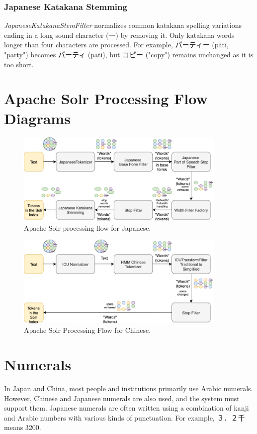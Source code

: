 \documentclass[11pt]{article}
\begin{document}
\subsubsection{Japanese Katakana Stemming}
\textit{JapaneseKatakanaStemFilter} normalizes common katakana spelling variations ending in a long sound character (ー) by removing it. Only katakana words longer than four characters are processed. For example, パーティー (pātī, "party") becomes パーティ (pāti), but コピー ("copy") remains unchanged as it is too short.

\section{Apache Solr Processing Flow Diagrams}

\begin{figure}[h!]
    \centering
    \includegraphics[width=0.9\textwidth]{schem1.png}
    \caption{Apache Solr processing flow for Japanese.}
    \label{fig:solr_japanese_flow}
\end{figure}

\begin{figure}[h!]
    \centering
    \includegraphics[width=0.9\textwidth]{chinese-japanese.png}
    \caption{Apache Solr Processing Flow for Chinese.}
    \label{fig:solr_chinese_flow}
\end{figure}

\section{Numerals}
In Japan and China, most people and institutions primarily use Arabic numerals. However, Chinese and Japanese numerals are also used, and the system must support them. Japanese numerals are often written using a combination of kanji and Arabic numbers with various kinds of punctuation. For example, ３．２千 means 3200.
\end{document}
